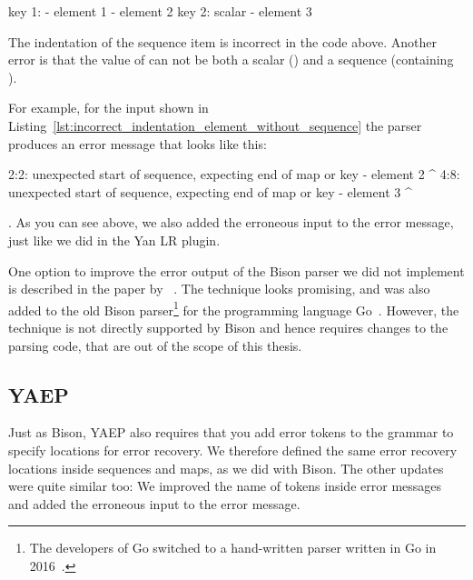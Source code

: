 \begin{listing}
  \begin{yamlcode}
    key 1: - element 1
     - element 2
    key 2: scalar
           - element 3
  \end{yamlcode}
  \caption{The indentation of the sequence item  is incorrect in the code above. Another error is that the value of  can not be both a scalar () and a sequence (containing ).}
  \label{lst:incorrect_indentation_element_without_sequence}
\end{listing}

For example, for the input shown in Listing~\ref{lst:incorrect_indentation_element_without_sequence} the parser produces an error message that looks like this:

\begin{textcode}
2:2: unexpected start of sequence, expecting end of map or key
      - element 2
      ^
4:8: unexpected start of sequence, expecting end of map or key
            - element 3
            ^
\end{textcode}

. As you can see above, we also added the erroneous input to the error message, just like we did in the Yan LR plugin.

One option to improve the error output of the Bison parser we did not implement is described in the paper  by \citeauthor{jeffery2003generating}~\cite{jeffery2003generating}. The technique looks promising, and was also added to the old Bison parser\footnote{The developers of Go switched to a hand-written parser written in Go in 2016~\cite{pike2017reddit, go2016release}.} for the programming language Go~\cite{cox2010errors}. However, the technique is not directly supported by Bison and hence requires changes to the parsing code, that are out of the scope of this thesis.

\subsection{YAEP}

Just as Bison, YAEP also requires that you add error tokens to the grammar to specify locations for error recovery. We therefore defined the same error recovery locations inside sequences and maps, as we did with Bison. The other updates were quite similar too: We improved the name of tokens inside error messages and added the erroneous input to the error message.

